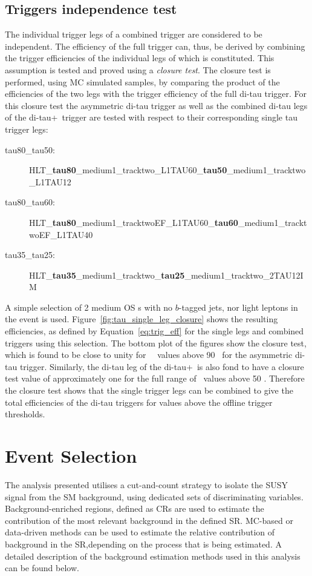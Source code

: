 	\subsection*{Triggers independence test}
	The individual trigger legs of a combined trigger are considered to be independent. 
	The efficiency of the full trigger can, thus, be derived by combining the trigger efficiencies of the individual legs of which is constituted. 
	This assumption is tested and proved using a \textit{closure test}.
	The closure test is performed, using \ac{MC} simulated samples, by comparing the product of the efficiencies of the two legs with the trigger efficiency of the full di-tau trigger.
	For this closure test the asymmetric di-tau trigger as well as the combined di-tau legs of the di-tau+\met\ trigger are tested with respect to their corresponding single tau trigger legs:
	\begin{description}
	\item[tau80\_tau50:] HLT\_\textbf{tau80}\_medium1\_tracktwo\_L1TAU60\_\textbf{tau50}\_medium1\_tracktwo\_L1TAU12
	\item[tau80\_tau60:] HLT\_\textbf{tau80}\_medium1\_tracktwoEF\_L1TAU60\_\textbf{tau60}\_medium1\_tracktwoEF\_L1TAU40
	\item[tau35\_tau25:] HLT\_\textbf{tau35}\_medium1\_tracktwo\_\textbf{tau25}\_medium1\_tracktwo\_2TAU12IM
	\end{description}	
	A simple selection of 2 medium \ac{OS} \ltau s with no $b$-tagged jets, nor light leptons in the event is used. 
	Figure~\ref{fig:tau_single_leg_closure} shows the resulting efficiencies, as defined by Equation~\ref{eq:trig_eff} for the single legs and combined triggers using this selection. The bottom plot of the figures show the closure test, which is found to be close to unity for \ltau\ \pt\ values above 90 \gev\  for the asymmetric di-tau trigger. Similarly, the di-tau leg of the di-tau+\met\ is also fond to have a closure test value of approximately one for the full range of \pt\ values above 50 \gev.
	Therefore the closure test shows that the single trigger legs can be combined to give the total efficiencies of the di-tau triggers for values above the offline trigger thresholds. 
	\ditauClosureTest
	\section{Event Selection}
	\label{sec:evtsel}
	The analysis presented utilises a cut-and-count strategy to isolate the \ac{SUSY} signal from the \ac{SM} background, using dedicated sets of discriminating variables. 
	Background-enriched regions, defined as \acp{CR} are used to estimate the contribution of the most relevant background in the defined \ac{SR}.
	\ac{MC}-based or data-driven methods can be used to estimate the relative contribution of background in the \ac{SR},depending on the process that is being estimated. 
	A detailed description of the background estimation methods used in this analysis can be found below. 
	
